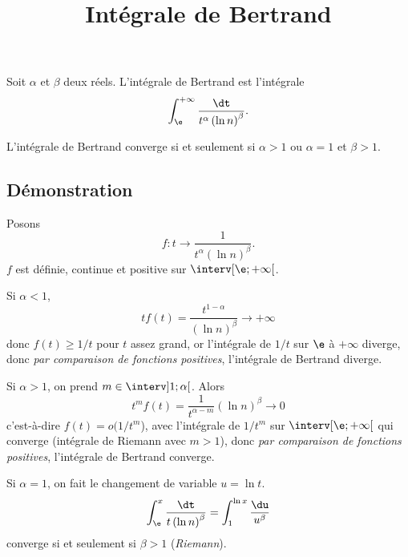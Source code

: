 \documentclass[fontsize=12pt,twoside=false,parskip=half, french]{scrartcl}
\title{Intégrale de Bertrand}
\date{}
\author{}
\begin{document}
\maketitle
    Soit $\alpha$ et $\beta$ deux réels. L’intégrale de Bertrand est l’intégrale
   \[
      \int_{\e}^{+\infty} \frac{\dt}{t^\alpha \left(\ln n \right)^\beta}.
   \]
   \begin{Theoreme}
      L’intégrale de Bertrand converge si et seulement si $\alpha > 1$ ou $\alpha = 1$ et $\beta > 1$.
   \end{Theoreme}
   \subsection{Démonstration}
      Posons
      \[
         f \colon t \to \frac{1}{t^\alpha \left(\ln n \right)^\beta}.
      \]
      $f$ est définie, continue et positive sur $\interv[\e ; +\infty[$.
      
      Si $\alpha < 1$,
      \[
         tf(t) = \frac{t^{1 -\alpha}}{\left(\ln n \right)^\beta} \to +\infty
      \]
      donc $f(t) \geq 1/t$ pour $t$ assez grand, or l’intégrale de $1/t$ sur $\e$ à $+\infty$ diverge, donc \emph{par comparaison de fonctions positives}, l’intégrale de Bertrand diverge.
      
      Si $\alpha > 1$, on prend $m \in \interv]1; \alpha[$. Alors
      \[
         t^mf(t) = \frac{1}{t^{\alpha - m}}{\left(\ln n \right)^\beta} \to 0
      \]
      c’est-à-dire $f(t) = o(1/t^m$), avec l’intégrale de $1/t^m$ sur $\interv[\e ; +\infty[$ qui converge (intégrale de Riemann avec $m > 1$), donc \emph{par comparaison de fonctions positives}, l’intégrale de Bertrand converge.
         
      Si $\alpha = 1$, on fait le changement de variable $u = \ln t$.
      \[
         \int_{\e}^x \frac{\dt}{t \left(\ln n \right)^\beta} = \int_1^{\ln x} \frac{\du}{u^\beta}
      \]
      converge si et seulement si $\beta > 1$ (\emph{Riemann}).
   
\end{document}
